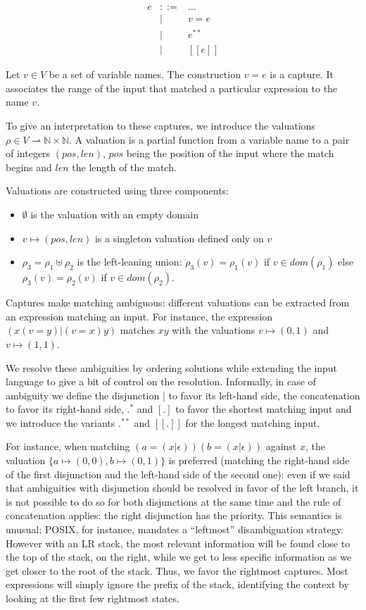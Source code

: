\documentclass{article}
\begin{document}
\[
\begin{array}{rrl}
  e &::=& \ldots
  \\  &|& v=e
  \\  &|& e^{*\!*}
  \\  &|& [\![e]\!]
\end{array}
\]

Let $v \in V$ be a set of variable names.
The construction $v=e$ is a capture. It associates the range of the input that matched a particular expression to the name $v$.

To give an interpretation to these captures, we introduce the valuations $\rho \in V \rightharpoonup \mathbb{N}\times\mathbb{N}$.
A valuation is a partial function from a variable name to a pair of integers $(pos,len)$, $pos$ being the position of the input where the match begins and $len$ the length of the match.

Valuations are constructed using three components:
\begin{itemize}
  \item $\emptyset$ is the valuation with an empty domain
  \item $v \mapsto (pos,len)$ is a singleton valuation defined only on $v$
  \item $\rho_3 = \rho_1 \uplus \rho_2$ is the left-leaning union: $\rho_3(v) = \rho_1(v)$ if $v \in dom(\rho_1)$ else $\rho_3(v)= \rho_2(v)$ if $v \in dom(\rho_2)$.
\end{itemize}

Captures make matching ambiguous: different valuations can be extracted from an expression matching an input. For instance, the expression $(x(v=y)|(v=x)y)$ matches $xy$ with the valuations $v\mapsto(0,1)$ and $v\mapsto(1,1)$.

We resolve these ambiguities by ordering solutions while extending the input language to give a bit of control on the resolution.
Informally, in case of ambiguity we define the disjunction $|$ to favor its left-hand side, the concatenation to favor its right-hand side, $.^{*}$ and $[.]$ to favor the shortest matching input and we introduce the variants $.^{**}$ and $[\![.]\!]$ for the longest matching input.

For instance, when matching $(a=(x|\epsilon))(b=(x|\epsilon))$ against $x$, the valuation $\{a\mapsto(0,0),b\mapsto(0,1)\}$ is preferred
(matching the right-hand side of the first disjunction and the left-hand side of the second one): even if we said that ambiguities with disjunction should be resolved in favor of the left branch, it is not possible to do so for both disjunctions at the same time and the rule of concatenation applies: the right disjunction has the priority. This semantics is unusual; POSIX, for instance, mandates a ``leftmost'' disambiguation strategy. However with an LR stack, the most relevant information will be found close to the top of the stack, on the right, while we get to less specific information as we get closer to the root of the stack. Thus, we favor the rightmost captures. Most expressions will simply ignore the prefix of the stack, identifying the context by looking at the first few rightmost states.
\end{document}
